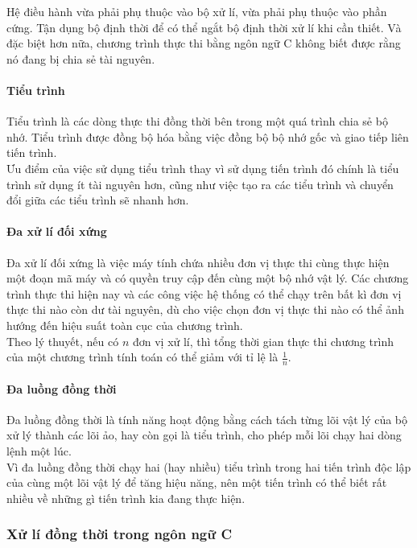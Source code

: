 \documentclass{article}
\begin{document}
Hệ điều hành vừa phải phụ thuộc vào bộ xử lí, vừa phải phụ thuộc vào phần cứng. Tận dụng bộ định thời để có thể ngắt bộ định thời xử lí khi cần thiết. Và đặc biệt hơn nữa, chương trình thực thi bằng ngôn ngữ C không biết được rằng nó đang bị chia sẻ tài nguyên.\\
\paragraph{Tiểu trình}
Tiểu trình là các dòng thực thi đồng thời bên trong một quá trình chia sẻ bộ nhớ. Tiểu trình được đồng bộ hóa bằng việc đồng bộ bộ nhớ gốc và giao tiếp liên tiến trình.\\

Ưu điểm của việc sử dụng tiểu trình thay vì sử dụng tiến trình đó chính là tiểu trình sử dụng ít tài nguyên hơn, cũng như việc tạo ra các tiểu trình và chuyển đổi giữa các tiểu trình sẽ nhanh hơn. 
\paragraph{Đa xử lí đối xứng}
Đa xử lí đối xứng là việc máy tính chứa nhiều đơn vị thực thi cùng thực hiện một đoạn mã máy và có quyền truy cập đến cùng một bộ nhớ vật lý. Các chương trình thực thi hiện nay và các công việc hệ thống có thể chạy trên bất kì đơn vị thực thi nào còn dư tài nguyên, dù cho việc chọn đơn vị thực thi nào có thể ảnh hướng đến hiệu suất toàn cục của chương trình.\\

Theo lý thuyết, nếu có $n$ đơn vị xử lí, thì tổng thời gian thực thi chương trình của một chương trình tính toán có thể giảm với tỉ lệ là $\frac{1}{n}$.
\paragraph{Đa luồng đồng thời}
Đa luồng đồng thời là tính năng hoạt động bằng cách tách từng lõi vật lý của bộ xử lý thành các lõi ảo, hay còn gọi là tiểu trình, cho phép mỗi lõi chạy hai dòng lệnh một lúc.\\

Vì đa luồng đồng thời chạy hai (hay nhiều) tiểu trình trong hai tiến trình độc lập của cùng một lõi vật lý để tăng hiệu năng, nên một tiến trình có thể biết rất nhiều về những gì tiến trình kia đang thực hiện.\\
\subsubsection{Xử lí đồng thời trong ngôn ngữ C}
\end{document}
